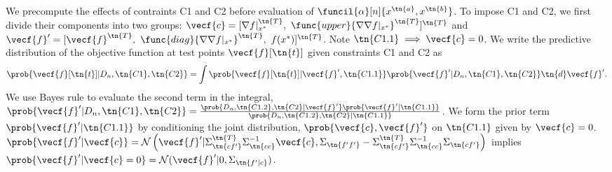 We precompute the effects of contraints C1 and C2 before evaluation of
$\funcil{\alpha}[n]{x^\tn{a}, x^\tn{b}}$. To impose C1 and C2, we first divide
their components into two groups: $\vecf{c} = [\nabla f|_{x^*}^\tn{T}, \
\func{upper}{\nabla \nabla f|_{x^*}}^\tn{T}]^\tn{T}$ and $\vecf{f}' =
[\vecf{f}^\tn{T},\ \func{diag}{\nabla \nabla f|_{x^*}}^\tn{T},\
f(x^*)]^\tn{T}$. Note $\tn{C1.1} \implies \vecf{c} = 0$. We write the predictive
distribution of the objective function at test points $\vecf{f}[\tn{t}]$ given
constraints C1 and C2 as
\begin{align}
    \prob{\vecf{f}[\tn{t}]|D_n, \tn{C1},\tn{C2}} = 
    \int\prob{\vecf{f}[\tn{t}]| \vecf{f}', \tn{C1.1}}  
    \prob{\vecf{f}' | D_n, \tn{C1}, \tn{C2}} \tn{d}\vecf{f}'.
    \label{eq:predictive_w_constraints}
\end{align}
We use Bayes rule to evaluate the second term in the integral, $\prob{\vecf{f}'
| D_n, \tn{C1}, \tn{C2}} = \frac{\prob{D_n , \tn{C1.2}, \tn{C2} |\vecf{f}'}
\prob{\vecf{f}'| \tn{C1.1}}}{\prob{D_n, \tn{C1.2}, \tn{C2} | \tn{C1.1}}}$. We
form the prior term $\prob{\vecf{f}'|\tn{C1.1}}$ by conditioning the joint
distribution, $\prob{\vecf{c}, \vecf{f}'}$  on $\tn{C1.1}$ given by $\vecf{c} =
0$. $\prob{\vecf{f}'|\vecf{c}} = \mathcal{N}\left( \vecf{f}'|
\Sigma_\tn{cf'}^\tn{T} \Sigma_\tn{cc}^{-1} \vecf{c}, \Sigma_\tn{f'f'} -
\Sigma_\tn{cf'}^\tn{T} \Sigma_\tn{cc}^{-1} \Sigma_\tn{cf'} \right)$ implies
$\prob{\vecf{f}'|\vecf{c}=0} = \mathcal{N}(\vecf{f}'| 0, \Sigma_\tn{f'|c})$.

